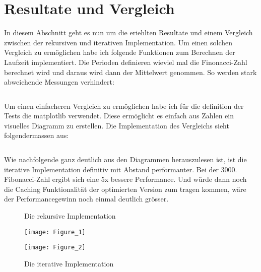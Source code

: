 \section{Resultate und Vergleich}
In diesem Abschnitt geht es nun um die eriehlten Resultate und
einem Vergleich zwischen der rekursiven und iterativen
Implementation. Um einen solchen Vergleich zu ermöglichen habe
ich folgende Funktionen zum Berechnen der Laufzeit implementiert.
Die Perioden definieren wieviel mal die Finonacci-Zahl
berechnet wird und daraus wird dann der Mittelwert genommen.
So werden stark abweichende Messungen verhindert:

\begin{mdframed}[backgroundcolor=bg]
    \inputminted{Python}{src/time_fibonacci.py}
\end{mdframed}

\newpage

Um einen einfacheren Vergleich zu ermöglichen habe ich
für die definition der Tests die matplotlib verwendet.
Diese ermöglicht es einfach aus Zahlen ein visuelles
Diagramm zu erstellen. Die Implementation des Vergleichs
sieht folgendermassen aus:

\begin{mdframed}[backgroundcolor=bg]
    \inputminted{Python}{src/time_fibonacci_test.py}
\end{mdframed}

Wie nachfolgende ganz deutlich aus den Diagrammen herauszulesen ist,
ist die iterative Implementation definitiv mit Abstand performanter.
Bei der 3000. Fibonacci-Zahl ergibt sich eine 5x bessere
Performance. Und würde dann noch die Caching Funktionalität
der optimierten Version zum tragen kommen, wäre der
Performancegewinn noch einmal deutlich grösser.

\begin{figure}[h]
    \centering
    \caption{Die rekursive Implementation}
    \texttt{[image: Figure\_1]}
    \caption{Die iterative Implementation}   
    \texttt{[image: Figure\_2]}
\end{figure}